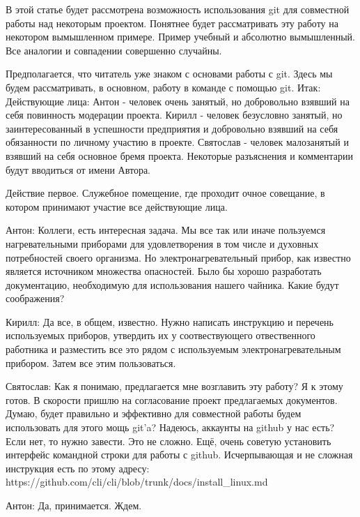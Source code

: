 В этой статье будет рассмотрена возможность использования git для совместной работы над 
некоторым проектом. Понятнее будет рассматривать эту работу на некотором вымышленном примере. 
Пример учебный и абсолютно вымышленный. Все аналогии и совпадении совершенно случайны.

Предполагается, что читатель уже знаком с основами работы с git. Здесь мы будем рассматривать,
в основном, работу в команде с помощью git.
Итак:
Действующие лица:
Антон - человек очень занятый, но добровольно взявший на себя повинность модерации проекта.
Кирилл - человек безусловно занятый, но заинтересованный в успешности предприятия и добровольно
взявший на себя обязанности по личному участию в проекте.
Святослав - человек малозанятый и взявший на себя основное бремя проекта.
Некоторые разъяснения и комментарии будут вводиться от имени Автора.

Действие первое. 
Служебное помещение, где проходит очное совещание, в котором принимают участие все действующие лица.

Антон: Коллеги, есть интересная задача. Мы все так или иначе пользуемся нагревательными приборами
для удовлетворения в том числе и духовных потребностей своего организма. Но электронагревательный 
прибор, как известно является источником множества опасностей. Было бы хорошо разработать
документацию, необходимую для использования нашего чайника. Какие будут соображения?

Кирилл: Да все, в общем, известно. Нужно написать инструкцию и перечень используемых приборов, 
утвердить их у соотвествующего отвественного работника и разместить все это рядом с используемым
электронагревательным прибором. Затем все этим пользоваться. 

Святослав: Как я понимаю, предлагается мне возглавить эту работу? Я к этому готов. В скорости
пришлю на согласование проект предлагаемых документов. Думаю, будет правильно и эффективно
для совместной работы будем использовать для этого мощь git'a? Надеюсь, аккаунты на github у нас есть?
Если нет, то нужно завести. Это не сложно. Ещё, очень советую установить интерфейс командной
строки для работы с github. Исчерпывающая и не сложная инструкция есть по этому адресу:
https://github.com/cli/cli/blob/trunk/docs/install\_linux.md

Антон: Да, принимается. Ждем.

